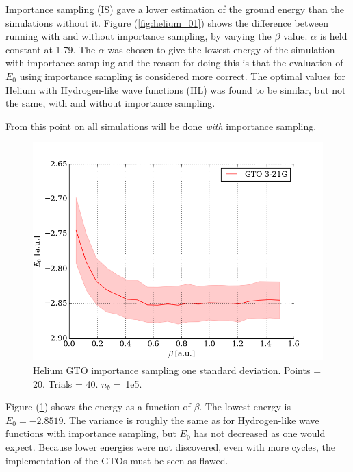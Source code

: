 \documentclass[twocolumns, a4paper,11pt,fleqn]{extarticle}
\begin{document}

Importance sampling (IS) gave a lower estimation of the ground energy than
the simulations without it. Figure (\ref{fig:helium_01}) shows the difference between
running with and without importance sampling, by varying the $\beta$ value. 
$\alpha$ is held constant at 1.79. 
The $\alpha$ was chosen to give the lowest energy of the simulation with 
importance sampling and the reason for doing this is that the evaluation of $E_0$ using
importance sampling is considered more correct.
The optimal values for Helium with Hydrogen-like wave functions (HL) was found to be 
similar, but not the same, with and without importance sampling.

From this point on all simulations will be done \textit{with} importance sampling.\\


\begin{figure}[H]
	\includegraphics[width=\columnwidth]{../res/plot/helium_05/helium_05_pretty.png}
	\caption{Helium GTO importance sampling one standard deviation. 
	Points = 20. Trials = 40.	$n_b = \:$1e5.}
	\label{fig:helium_05}
\end{figure}
Figure (\ref{fig:helium_05}) shows the energy as a function of $\beta$. 
The lowest energy is $E_0 = -2.8519$. 
The variance is roughly the same as for Hydrogen-like wave functions 
with importance sampling,
but $E_0$ has not decreased as one would expect. Because lower energies were
not discovered, even with more cycles, 
the implementation of the GTOs must be seen as flawed.
\end{document}
